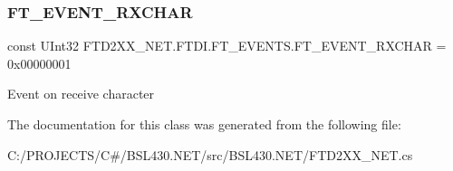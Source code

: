 \subsubsection{\texorpdfstring{FT\_EVENT\_RXCHAR}{FT\_EVENT\_RXCHAR}}
{\footnotesize\ttfamily const U\+Int32 F\+T\+D2\+X\+X\+\_\+\+N\+E\+T.\+F\+T\+D\+I.\+F\+T\+\_\+\+E\+V\+E\+N\+T\+S.\+F\+T\+\_\+\+E\+V\+E\+N\+T\+\_\+\+R\+X\+C\+H\+AR = 0x00000001}



Event on receive character 



The documentation for this class was generated from the following file\+:\begin{DoxyCompactItemize}
\item 
C\+:/\+P\+R\+O\+J\+E\+C\+T\+S/\+C\#/\+B\+S\+L430.\+N\+E\+T/src/\+B\+S\+L430.\+N\+E\+T/F\+T\+D2\+X\+X\+\_\+\+N\+E\+T.\+cs\end{DoxyCompactItemize}
